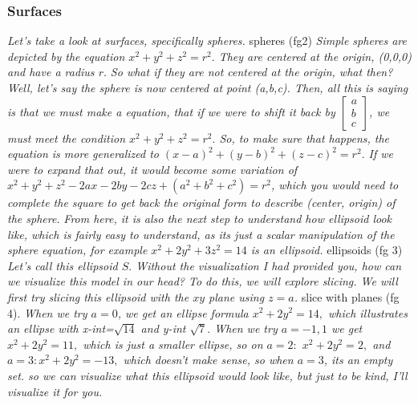 \documentclass[addpoints]{exam}
\begin{document}
\subsubsection{
Surfaces
}
\textit{
Let's take a look at surfaces, specifically spheres.
}
spheres (fg2)
\textit{
Simple spheres are depicted by the equation $x^2+y^2+z^2=r^2.$ They are centered at the origin, (0,0,0) and have a radius $r.$ So what if they are not centered at the origin, what then? Well, let's say the sphere is now centered at point (a,b,c). Then, all this is saying is that we must make a equation, that if we were to shift it back by $\begin{bmatrix}
    a\\b\\c
\end{bmatrix}$, we must meet the condition $x^2+y^2+z^2=r^2.$ So, to make sure that happens, the equation is more generalized to $(x-a)^2+(y-b)^2+(z-c)^2=r^2.$ If we were to expand that out, it would become some variation of $x^2+y^2+z^2-2ax-2by-2cz+(a^2+b^2+c^2)=r^2$, which you would need to complete the square to get back the original form to describe (center, origin) of the sphere.
}
\textit{
From here, it is also the next step to understand how ellipsoid look like, which is fairly easy to understand, as its just a scalar manipulation of the sphere equation, for example $x^2+2y^2+3z^2=14$ is an ellipsoid.
}
ellipsoids (fg 3)
\textit{
Let's call this ellipsoid $S.$ Without the visualization I had provided you, how can we visualize this model in our head? To do this, we will explore slicing. We will first try slicing this ellipsoid with the $xy$ plane using $z=a$. 
}
slice with planes (fg 4).
\textit{
When we try $a=0$, we get an ellipse formula $x^2+2y^2=14,$ which illustrates an ellipse with x-int=$\sqrt{14}$ and y-int $\sqrt{7}.$ When we try $a=-1,1$ we get $x^2+2y^2=11,$ which is just a smaller ellipse, so on $a=2:$ $x^2+2y^2=2,$ and $a=3:$$x^2+2y^2=-13,$ which doesn't make sense, so when $a=3$, its an empty set. so we can visualize what this ellipsoid would look like, but just to be kind, I'll visualize it for you.
}
\end{document}
